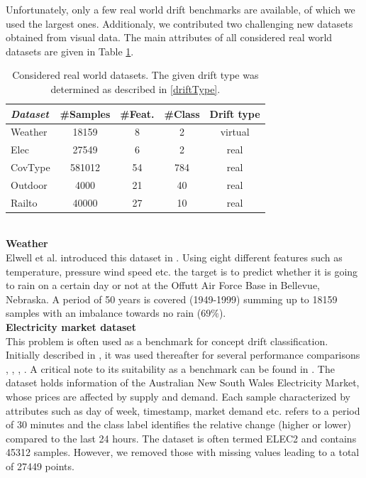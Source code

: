 \documentclass[conference]{IEEEtran}
\begin{document}
Unfortunately, only a few real world drift benchmarks are available, of which we used the largest ones. Additionaly, we contributed two challenging new datasets obtained from visual data.
The main attributes of all considered real world datasets are given in Table \ref{tab:realDatasets}.
\begin{table}
\caption{Considered real world datasets. The given drift type was determined as described in \ref{driftType}.}
\label{tab:realDatasets}
\centering
\begin{tabular}{l|cccc}
\textit{Dataset} & \#Samples&\#Feat.&\#Class&Drift type\\\hline
\rule{0pt}{8pt}
Weather & 18159 & 8 & 2 & virtual\\
Elec & 27549 & 6 & 2 & real\\
CovType & 581012 & 54 & 784 & real\\
Outdoor & 4000 & 21 & 40 & real\\
Railto & 40000 & 27 & 10 & real\\
\end{tabular}
\end{table}
\\\textbf{Weather}\\
Elwell et al. introduced this dataset in \cite{5975223}. Using eight different features such as temperature, pressure wind speed etc. the target is to predict 
whether it is going to rain on a certain day or not at the Offutt Air Force Base in Bellevue, Nebraska.
A period of 50 years is covered (1949-1999) summing up to 18159 samples with an imbalance towards no rain ($69\%$).\\
\textbf{Electricity market dataset}\\
This problem is often used as a benchmark for concept drift classification. Initially described in \cite{harries1999splice}, it was used thereafter for several performance comparisons \cite{baena2006early}, \cite{kuncheva2008adaptive}, \cite{Bifet:2013:EDS:2480362.2480516}, \cite{gama2004learning}. 
A critical note to its suitability as a benchmark can be found in \cite{zliobaite2013good}.
The dataset holds information of the Australian New South Wales Electricity Market, whose prices are affected by supply and demand. 
Each sample characterized by attributes such as day of week, timestamp, market demand etc. refers to a period of 30 minutes and the class label identifies the relative change (higher or lower) compared to the last 24 hours.
The dataset is often termed ELEC2 and contains 45312 samples. However, we removed those with missing values leading to a total of 27449 points.\\
\end{document}
